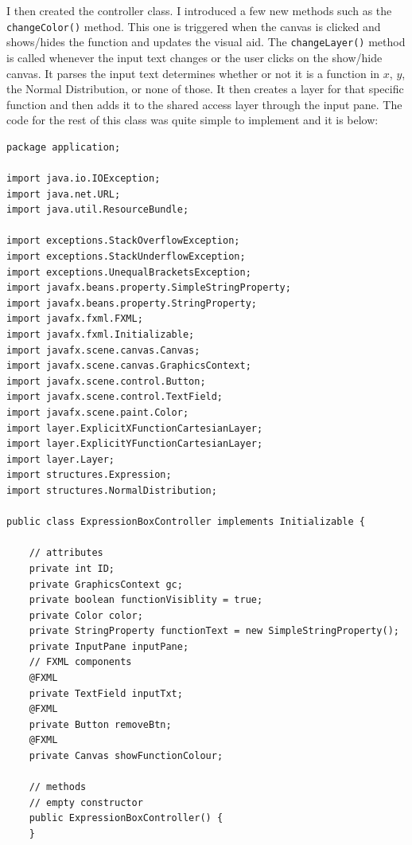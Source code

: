 \documentclass[../../../../main.tex]{subfiles}
\begin{document}
\newpage
I then created the controller class. I introduced a few new methods such as the \texttt{changeColor()} method. This one is triggered when the canvas is clicked and shows/hides the function and updates the visual aid. The \texttt{changeLayer()} method is called whenever the input text changes or the user clicks on the show/hide canvas. It parses the input text determines whether or not it is a function in $x$, $y$, the Normal Distribution, or none of those. It then creates a layer for that specific function and then adds it to the shared access layer through the input pane. The code for the rest of this class was quite simple to implement and it is below:
\begin{verbatim}
package application;

import java.io.IOException;
import java.net.URL;
import java.util.ResourceBundle;

import exceptions.StackOverflowException;
import exceptions.StackUnderflowException;
import exceptions.UnequalBracketsException;
import javafx.beans.property.SimpleStringProperty;
import javafx.beans.property.StringProperty;
import javafx.fxml.FXML;
import javafx.fxml.Initializable;
import javafx.scene.canvas.Canvas;
import javafx.scene.canvas.GraphicsContext;
import javafx.scene.control.Button;
import javafx.scene.control.TextField;
import javafx.scene.paint.Color;
import layer.ExplicitXFunctionCartesianLayer;
import layer.ExplicitYFunctionCartesianLayer;
import layer.Layer;
import structures.Expression;
import structures.NormalDistribution;

public class ExpressionBoxController implements Initializable {

	// attributes
	private int ID;
	private GraphicsContext gc;
	private boolean functionVisiblity = true;
	private Color color;
	private StringProperty functionText = new SimpleStringProperty();
	private InputPane inputPane;
	// FXML components
	@FXML
	private TextField inputTxt;
	@FXML
	private Button removeBtn;
	@FXML
	private Canvas showFunctionColour;

	// methods
	// empty constructor
	public ExpressionBoxController() {
	}


\end{verbatim}
\end{document}
